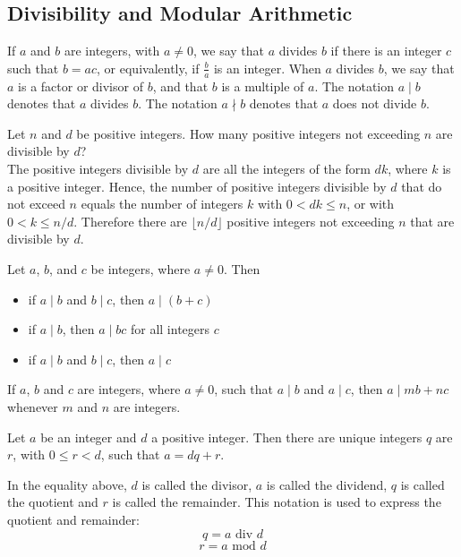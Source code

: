 \documentclass[12pt]{article}
\begin{document}
\subsection{Divisibility and Modular Arithmetic} 
\begin{definition} If $a$ and $b$ are integers, with $a \neq 0$, we say that $a$ divides $b$ if there is an integer $c$ such that $b = ac$, or equivalently, if $\frac{b}{a}$ is an integer. When $a$ divides $b$, we say that $a$ is a factor or divisor of $b$, and that $b$ is a multiple of $a$. The notation $a \mid b$ denotes that $a$ divides $b$. The notation $a \nmid b$ denotes that $a$ does not divide $b$. \end{definition} 
\begin{example} Let $n$ and $d$ be positive integers. How many positive integers not exceeding $n$ are divisible by $d$? \\ The positive integers divisible by $d$ are all the integers of the form $dk$, where $k$ is a positive integer. Hence, the number of positive integers divisible by $d$ that do not exceed $n$ equals the number of integers $k$ with $0 < dk \leq n$, or with $0 < k \leq n/d$. Therefore there are $\lfloor n/d \rfloor$ positive integers not exceeding $n$ that are divisible by $d$. \end{example} 
\begin{theorem} Let $a$, $b$, and $c$ be integers, where $a \neq 0$. Then \begin{itemize} 
\item if $a \mid b$ and $b \mid c$, then $a \mid (b + c)$ 
\item if $a \mid b$, then $a \mid bc$ for all integers $c$ 
\item if $a \mid b$ and $b \mid c$, then $a \mid c$ \end{itemize} \end{theorem} 
\begin{theorem} If $a$, $b$ and $c$ are integers, where $a \neq 0$, such that $a \mid b$ and $a \mid c$, then $a \mid mb + nc $ whenever $m$ and $n$ are integers. \end{theorem} 
\begin{theorem} Let $a$ be an integer and $d$ a positive integer. Then there are unique integers $q$ are $r$, with $ 0 \leq r < d$, such that $a = dq + r$. \end{theorem} 
\begin{definition} In the equality above, $d$ is called the divisor, $a$ is called the dividend, $q$ is called the quotient and $r$ is called the remainder. This notation is used to express the quotient and remainder: $$q = a \text{ div } d$$ $$r = a \text{ mod } d $$ \end{definition} 
\end{document}
